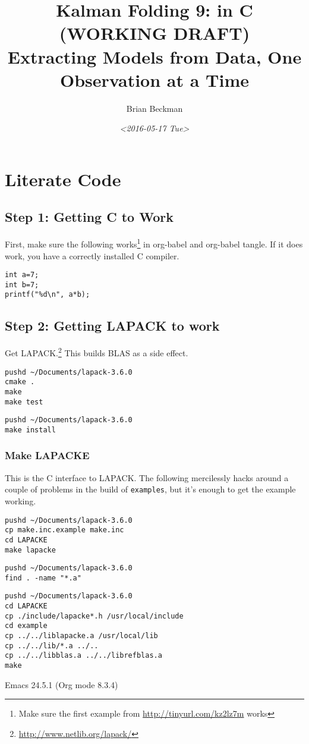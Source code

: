 \documentclass[10pt,oneside,x11names]{article}
\author{Brian Beckman}
\date{\textit{<2016-05-17 Tue>}}
\title{Kalman Folding 9: in C (WORKING DRAFT)\\\medskip
\large Extracting Models from Data, One Observation at a Time}
\begin{document}
\maketitle
\setcounter{tocdepth}{2}
\tableofcontents


\section{Literate Code}
\label{sec:orgheadline4}

\subsection{Step 1: Getting C to Work}
\label{sec:orgheadline1}

First, make sure the following works\footnote{Make sure the first example from \url{http://tinyurl.com/kz2lz7m} works} in org-babel and org-babel tangle. If it
does work, you have a correctly installed C compiler.

\begin{verbatim}
int a=7;
int b=7;
printf("%d\n", a*b);
\end{verbatim}

\subsection{Step 2: Getting LAPACK to work}
\label{sec:orgheadline3}

Get LAPACK.\footnote{\url{http://www.netlib.org/lapack/}}
This builds BLAS as a side effect.

\begin{verbatim}
pushd ~/Documents/lapack-3.6.0
cmake .
make
make test
\end{verbatim}

\begin{verbatim}
pushd ~/Documents/lapack-3.6.0
make install
\end{verbatim}

\subsubsection{Make LAPACKE}
\label{sec:orgheadline2}

This is the C interface to LAPACK.  The following mercilessly hacks around a couple of
problems in the build of \texttt{examples}, but it's enough to get the example working.

\begin{verbatim}
pushd ~/Documents/lapack-3.6.0
cp make.inc.example make.inc
cd LAPACKE
make lapacke
\end{verbatim}

\begin{verbatim}
pushd ~/Documents/lapack-3.6.0
find . -name "*.a"
\end{verbatim}

\begin{verbatim}
pushd ~/Documents/lapack-3.6.0
cd LAPACKE
cp ./include/lapacke*.h /usr/local/include
cd example
cp ../../liblapacke.a /usr/local/lib
cp ../../lib/*.a ../..
cp ../../libblas.a ../../librefblas.a
make
\end{verbatim}
Emacs 24.5.1 (Org mode 8.3.4)
\end{document}
